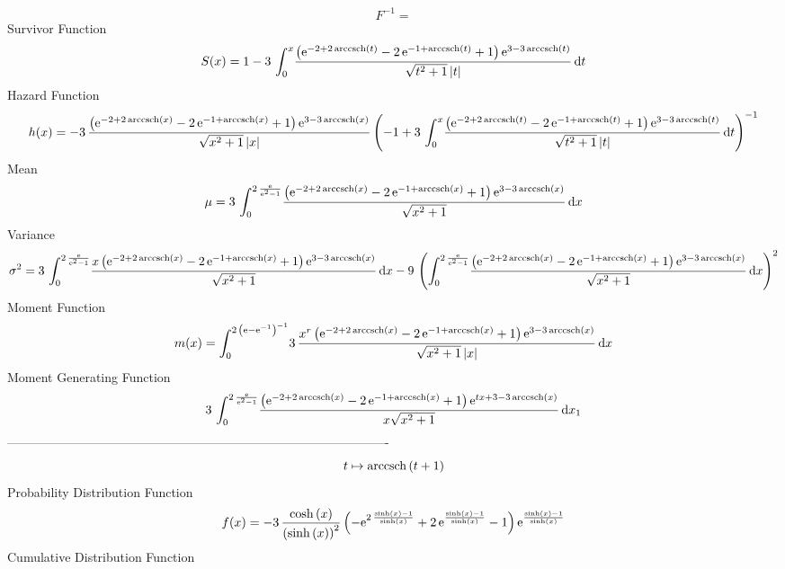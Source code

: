 \documentclass[12pt]{article}
\begin{document}
  $$F^{-1} = $$Survivor Function 
 $$ S(x)=1-3\,\int_{0}^{x}\!{\frac { \left( {{\rm e}^{-2+2\,{\rm arccsch} 
\left(t\right)}}-2\,{{\rm e}^{-1+{\rm arccsch} \left(t\right)}}+1
 \right) {{\rm e}^{3-3\,{\rm arccsch} \left(t\right)}}}{\sqrt {{t}^{2}
+1} \left| t \right| }}\,{\rm d}t
$$ Hazard Function 
 $$ h(x)=-3\,{\frac { \left( {{\rm e}^{-2+2\,{\rm arccsch} \left(x\right)}}-2\,
{{\rm e}^{-1+{\rm arccsch} \left(x\right)}}+1 \right) {{\rm e}^{3-3\,
{\rm arccsch} \left(x\right)}}}{\sqrt {{x}^{2}+1} \left| x \right| }
 \left( -1+3\,\int_{0}^{x}\!{\frac { \left( {{\rm e}^{-2+2\,
{\rm arccsch} \left(t\right)}}-2\,{{\rm e}^{-1+{\rm arccsch} \left(t
\right)}}+1 \right) {{\rm e}^{3-3\,{\rm arccsch} \left(t\right)}}}{
\sqrt {{t}^{2}+1} \left| t \right| }}\,{\rm d}t \right) ^{-1}}
$$Mean 
 $$ \mu=3\,\int_{0}^{2\,{\frac {{\rm e}}{{{\rm e}^{2}}-1}}}\!{\frac { \left( {
{\rm e}^{-2+2\,{\rm arccsch} \left(x\right)}}-2\,{{\rm e}^{-1+
{\rm arccsch} \left(x\right)}}+1 \right) {{\rm e}^{3-3\,{\rm arccsch} 
\left(x\right)}}}{\sqrt {{x}^{2}+1}}}\,{\rm d}x
$$ Variance 
 $$ \sigma^2 = 3\,\int_{0}^{2\,{\frac {{\rm e}}{{{\rm e}^{2}}-1}}}\!{\frac {x \left( 
{{\rm e}^{-2+2\,{\rm arccsch} \left(x\right)}}-2\,{{\rm e}^{-1+
{\rm arccsch} \left(x\right)}}+1 \right) {{\rm e}^{3-3\,{\rm arccsch} 
\left(x\right)}}}{\sqrt {{x}^{2}+1}}}\,{\rm d}x-9\, \left( \int_{0}^{2
\,{\frac {{\rm e}}{{{\rm e}^{2}}-1}}}\!{\frac { \left( {{\rm e}^{-2+2
\,{\rm arccsch} \left(x\right)}}-2\,{{\rm e}^{-1+{\rm arccsch} \left(x
\right)}}+1 \right) {{\rm e}^{3-3\,{\rm arccsch} \left(x\right)}}}{
\sqrt {{x}^{2}+1}}}\,{\rm d}x \right) ^{2}
$$Moment Function 
 $$ m(x) = \int_{0}^{2\, \left( {\rm e}-{{\rm e}^{-1}} \right) ^{-1}}\!3\,{\frac 
{{x}^{r} \left( {{\rm e}^{-2+2\,{\rm arccsch} \left(x\right)}}-2\,{
{\rm e}^{-1+{\rm arccsch} \left(x\right)}}+1 \right) {{\rm e}^{3-3\,
{\rm arccsch} \left(x\right)}}}{\sqrt {{x}^{2}+1} \left| x \right| }}
\,{\rm d}x
$$ Moment Generating Function 
 $$3\,\int_{0}^{2\,{\frac {{\rm e}}{{{\rm e}^{2}}-1}}}\!{\frac { \left( {
{\rm e}^{-2+2\,{\rm arccsch} \left(x\right)}}-2\,{{\rm e}^{-1+
{\rm arccsch} \left(x\right)}}+1 \right) {{\rm e}^{tx+3-3\,
{\rm arccsch} \left(x\right)}}}{x\sqrt {{x}^{2}+1}}}\,{\rm d}x_{{1}}
$$-------------------------------------------------------------------------------------------  \\$$t\mapsto {\rm arccsch} \left(t+1\right)
$$Probability Distribution Function 
$$  f(x)=-3\,{\frac {\cosh \left( x \right) }{ \left( \sinh \left( x \right) 
 \right) ^{2}} \left( -{{\rm e}^{2\,{\frac {\sinh \left( x \right) -1
}{\sinh \left( x \right) }}}}+2\,{{\rm e}^{{\frac {\sinh \left( x
 \right) -1}{\sinh \left( x \right) }}}}-1 \right) {{\rm e}^{{\frac {
\sinh \left( x \right) -1}{\sinh \left( x \right) }}}}}
$$Cumulative Distribution Function  
\end{document}
